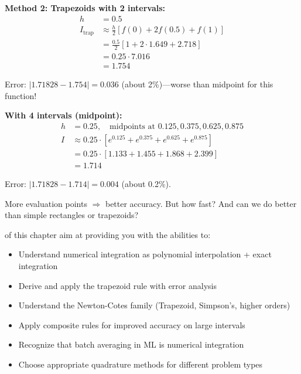 
\vspace{1em}
\textbf{Method 2: Trapezoids with 2 intervals:}
\begin{align*}
    h &= 0.5 \\
    I_{\text{trap}} &\approx \frac{h}{2}[f(0) + 2f(0.5) + f(1)] \\
    &= \frac{0.5}{2}[1 + 2 \cdot 1.649 + 2.718] \\
    &= 0.25 \cdot 7.016 \\
    &= 1.754
\end{align*}

Error: $|1.71828 - 1.754| = 0.036$ (about 2\%)---worse than midpoint for this function!

\vspace{1em}
\textbf{With 4 intervals (midpoint):}
\begin{align*}
    h &= 0.25, \quad \text{midpoints at } 0.125, 0.375, 0.625, 0.875 \\
    I &\approx 0.25 \cdot [e^{0.125} + e^{0.375} + e^{0.625} + e^{0.875}] \\
    &= 0.25 \cdot [1.133 + 1.455 + 1.868 + 2.399] \\
    &= 1.714
\end{align*}

Error: $|1.71828 - 1.714| = 0.004$ (about 0.2\%).


 More evaluation points $\Rightarrow$ better accuracy. But how fast? And can we do better than simple rectangles or trapezoids?


\vspace{2em}
 of this chapter aim at providing you with the abilities to:
\begin{itemize}
    \item Understand numerical integration as polynomial interpolation + exact integration
    \item Derive and apply the trapezoid rule with error analysis
    \item Understand the Newton-Cotes family (Trapezoid, Simpson's, higher orders)
    \item Apply composite rules for improved accuracy on large intervals
    \item Recognize that batch averaging in ML is numerical integration
    \item Choose appropriate quadrature methods for different problem types
\end{itemize}




